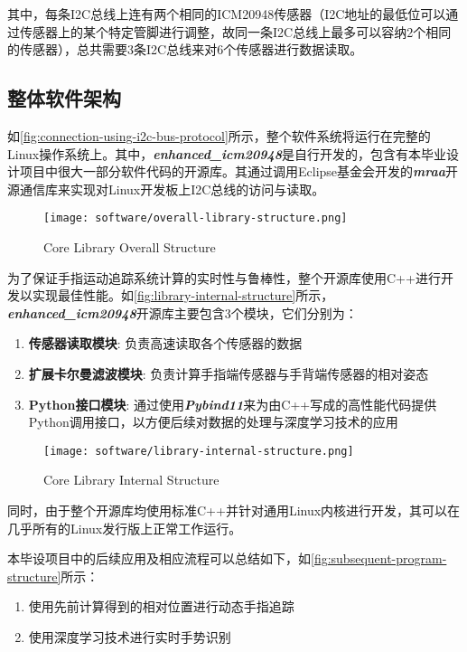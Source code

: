 其中，每条I2C总线上连有两个相同的ICM20948传感器（I2C地址的最低位可以通过传感器上的某个特定管脚进行调整，故同一条I2C总线上最多可以容纳2个相同的传感器），总共需要3条I2C总线来对6个传感器进行数据读取。

\subsection{整体软件架构}

如\autoref{fig:connection-using-i2c-bus-protocol}所示，整个软件系统将运行在完整的Linux操作系统上。其中，{\bfseries \itshape enhanced\_icm20948}是自行开发的，包含有本毕业设计项目中很大一部分软件代码的开源库。其通过调用Eclipse基金会开发的{\bfseries \itshape mraa}开源通信库来实现对Linux开发板上I2C总线的访问与读取。

\begin{figure}[H]
    \centering
    \texttt{[image: software/overall-library-structure.png]}
    \caption{\label{fig:overall-library-structure}Core Library Overall Structure}
\end{figure}

为了保证手指运动追踪系统计算的实时性与鲁棒性，整个开源库使用C++进行开发以实现最佳性能。如\autoref{fig:library-internal-structure}所示，{\bfseries \itshape enhanced\_icm20948}开源库主要包含3个模块，它们分别为：
\begin{enumerate}
    \item {\bfseries 传感器读取模块}: 负责高速读取各个传感器的数据
    \item {\bfseries 扩展卡尔曼滤波模块}: 负责计算手指端传感器与手背端传感器的相对姿态
    \item {\bfseries Python接口模块}: 通过使用{\bfseries \itshape Pybind11}来为由C++写成的高性能代码提供Python调用接口，以方便后续对数据的处理与深度学习技术的应用
\end{enumerate}

\begin{figure}[H]
    \centering
    \texttt{[image: software/library-internal-structure.png]}
    \caption{\label{fig:library-internal-structure}Core Library Internal Structure}
\end{figure}

同时，由于整个开源库均使用标准C++并针对通用Linux内核进行开发，其可以在几乎所有的Linux发行版上正常工作运行。

本毕设项目中的后续应用及相应流程可以总结如下，如\autoref{fig:subsequent-program-structure}所示：
\begin{enumerate}
    \item 使用先前计算得到的相对位置进行动态手指追踪
    \item 使用深度学习技术进行实时手势识别
\end{enumerate}

